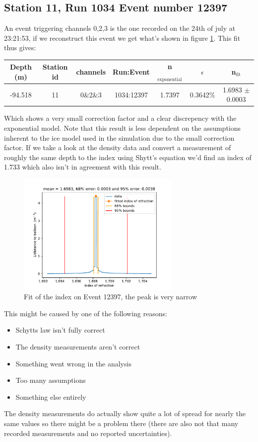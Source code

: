 \subsection{Station 11, Run 1034 Event number 12397}
An event triggering channels 0,2,3 is the one recorded on the 24th of july at 23:21:53,
if we reconstruct this event we get what's shown in figure \ref{fig:Event12397}.
This fit thus gives:
\begin{center}
\begin{tabular}{||c c c c c c c||}
 \hline
 Depth (m) & Station id & channels & Run:Event & n$_\text{exponential}$ & $\epsilon$ & n$_\text{fit}$\\ [0.5ex]
 \hline\hline
 -94.518 & 11 & 0\&2\&3 & 1034:12397 & 1.7397 & 0.3642\% & 1.6983 $\pm$ 0.0003 \\
 \hline
\end{tabular}
\end{center}
Which shows a very small correction factor and a clear discrepency with the
exponential model. Note that this result is less dependent on the assumptions
inherent to the ice model used in the simulation due to the small correction
factor.  
\newpage
If we take a look at the density data and convert a measurement of
roughly the same depth to the index using Shytt's equation we'd find an index
of 1.733 which also isn't in agreement with this result.
\begin{figure}
	\centering
	\includegraphics[width=0.7\textwidth]{figures/Event12397.pdf}
  \caption{Fit of the index on Event 12397, the peak is very narrow}
	\label{fig:Event12397}
\end{figure}
This might be caused by one of the following reasons:
\begin{itemize}
	\item Schytts law isn't fully correct
	\item The density measurements aren't correct
	\item Something went wrong in the analysis
  \item Too many assumptions
  \item Something else entirely
\end{itemize}
The density measurements do actually show quite a lot of spread for nearly
the same values so there might be a problem there (there are also not that many
recorded measurements and no reported uncertainties).  

